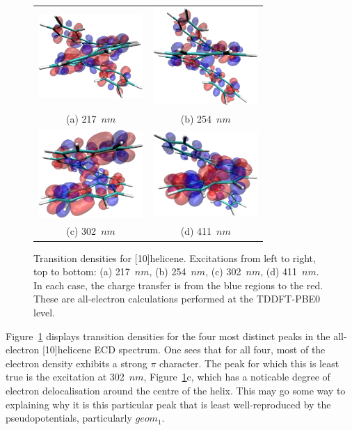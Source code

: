 \documentclass[aip,reprint,nofootinbib]{revtex4-1}
\begin{document}
\begin{figure}
\begin{tabular}{cc}
\includegraphics[width=4cm]{h10-pk1} &
\includegraphics[width=4cm]{h10-pk2} \\
(a) 217~$nm$ & (b) 254~$nm$ \\
\includegraphics[width=4cm]{h10-pk3} &
\includegraphics[width=4cm]{h10-pk4} \\
(c) 302~$nm$ & (d) 411~$nm$ \\
\end{tabular}
\caption[{[10]}helicene transition densities.]{Transition densities for [10]helicene. Excitations from left to right, top to bottom: (a) 217~$nm$, (b) 254~$nm$, (c) 302~$nm$, (d) 411~$nm$. In each case, the charge transfer is from the blue regions to the red. These are all-electron calculations performed at the TDDFT-PBE0 level.}\label{fig:helipeaks}
\end{figure}

Figure~\ref{fig:helipeaks} displays transition densities for the four most distinct peaks in the all-electron [10]helicene ECD spectrum. One sees that for all four, most of the electron density exhibits a strong $\pi$ character. The peak for which this is least true is the excitation at 302~$nm$, Figure~\ref{fig:helipeaks}c, which has a noticable degree of electron delocalisation around the centre of the helix. This may go some way to explaining why it is this particular peak that is least well-reproduced by the pseudopotentials, particularly $geom_1$.
\end{document}
